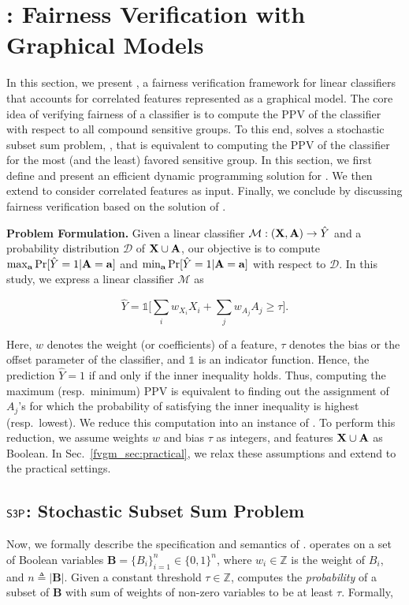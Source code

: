 \section{{\fvgm}: Fairness Verification with Graphical Models}\label{fvgm_sec:fvgm}

In this section, we present {\fvgm}, a fairness verification framework for linear classifiers that accounts for correlated features represented as a graphical model. The core idea of verifying fairness of a classifier is to compute the PPV of the classifier with respect to all compound sensitive groups. To this end, {\fvgm} solves a stochastic subset sum problem, {\stochastic}, that is equivalent to computing the PPV of the classifier for the most (and the least) favored sensitive group. In this section, we first define {\stochastic} and present an efficient dynamic programming solution for {\stochastic}. We then extend {\stochastic} to consider correlated features as input. Finally, we conclude by discussing fairness verification based on the solution of {\stochastic}.


\textbf{Problem Formulation.}	
Given a linear classifier $ \mathcal{M}: (\mathbf{X}, \mathbf{A}) \rightarrow \hat{Y} $ and a probability distribution $ \mathcal{D} $ of $ \mathbf{X} \cup \mathbf{A} $, our objective is to compute $ \max_{ \mathbf{a}} \Pr[\hat{Y} =1 | \mathbf{A} = \mathbf{a}] $ and $ \min_{ \mathbf{a}} \Pr[\hat{Y} =1 | \mathbf{A} = \mathbf{a}] $ with respect to $ \mathcal{D} $. In this study, we express a linear classifier $\mathcal{M}$ as 

\[	\hat{Y} = \mathds{1}\Big[\sum_{i} w_{X_i}X_i + \sum_{j} w_{A_j}A_j \ge \tau\Big].\]

Here, $ w $ denotes the weight (or coefficients) of a feature, $ \tau $ denotes the bias or the offset parameter of the classifier, and $\mathds{1}$ is an indicator function. Hence, the prediction $ \hat{Y} =1 $ if and only if the inner inequality holds.
Thus, computing the maximum (resp.\ minimum) PPV is equivalent to finding out the assignment of $A_j$'s for which the probability of satisfying the inner inequality is highest (resp.\ lowest). We reduce this computation into an instance of {\stochastic}. To perform this reduction, we assume  weights $ w $ and bias $ \tau $ as integers, and features $\mathbf{X} \cup \mathbf{A} $ as Boolean. In Sec.~\ref{fvgm_sec:practical}, we relax these assumptions and extend to the practical settings. 

\subsection{$ \mathsf{S3P} $: Stochastic Subset Sum Problem}\label{fvgm_sec:stochastic_sum_set_sum}
Now, we formally describe the specification and semantics of {\stochastic}.
{\stochastic} operates on  a set of Boolean variables $ \mathbf{B} = \{B_i\}_{i=1}^{n} \in \{0,1\}^{n} $, where $ w_i \in \mathbb{Z} $ is the weight of $ B_i $, and $n \triangleq |\mathbf{B}|$. Given a constant threshold $ \tau \in \mathbb{Z} $, {\stochastic} computes the \textit{probability} of a subset of $ \mathbf{B} $ with sum of weights of non-zero variables to be at least $ \tau $. Formally,

